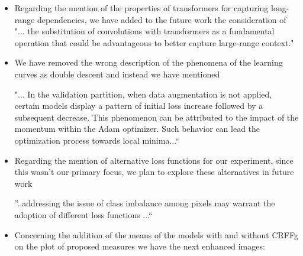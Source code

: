 \documentclass[review,12pt]{report}
\newenvironment{reviewer}{\setcounter{pointcounter}{1}}{}
\begin{document}
\begin{reviewer}
{\begin{itemize}
        \begin{align}
        z_{\boldsymbol{\omega}}(\mathbf{x}) &= \sqrt{2} \cos(\boldsymbol{\omega}^{\top}\mathbf{x} + b) \label{equ:z_mapping}
        \end{align}
        \begin{align}
        z_{\boldsymbol{\omega}}(\mathbf{x}) &= \begin{bmatrix}
        \cos(\boldsymbol{\omega}^{\top}\mathbf{x}) \\
        \sin(\boldsymbol{\omega}^{\top}\mathbf{x})
        \end{bmatrix}
        \label{equ:z_mapping_sin_cosin}
        \end{align}


        where $\boldsymbol{\omega} \sim p(\boldsymbol{\omega})$ and
        $b \sim \text{Uniform}(0, 2\pi)$.''

        Moreover, in future work, the use of different mapping is proposed.

    \item  Regarding the mention of the properties of transformers for capturing long-range dependencies, we have added to the future work the consideration of "... the substitution of convolutions with transformers as a fundamental operation that could be advantageous to better capture large-range context."


    \item We have removed the wrong description of the phenomena of the learning curves as double descent \cite{nakkiran2019deep} and instead we have mentioned 
    
    "... In the validation partition, when data augmentation is not applied, certain models display a pattern of initial loss increase followed by a subsequent decrease. This phenomenon can be attributed to the impact of the momentum within the Adam optimizer. Such behavior can lead the optimization process towards local minima...``


    \item Regarding the mention of alternative loss functions for our experiment, since this wasn't our primary focus, we plan to explore these alternatives in future work

    ''..addressing the issue of class imbalance among pixels may warrant the adoption of different loss functions \cite{YEUNG2022102026}...``


    \item Concerning the addition of the means of the models with and without CRFFg on the plot of proposed measures we have the next enhanced images: 


\end{itemize}}
\end{reviewer}
\end{document}
